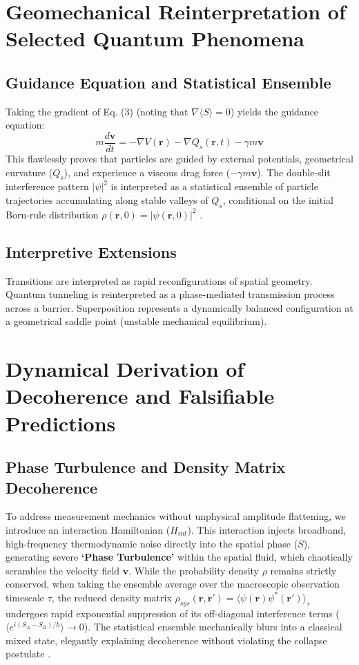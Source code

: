 \documentclass[reprint,amsmath,amssymb,aps,prd]{revtex4-2}
\begin{document}
\section{Geomechanical Reinterpretation of Selected Quantum Phenomena}

\subsection{Guidance Equation and Statistical Ensemble}
Taking the gradient of Eq. (3) (noting that $\nabla \langle S \rangle = 0$) yields the guidance equation:
\begin{equation}
m \frac{d\mathbf{v}}{dt} = -\nabla V(\mathbf{r}) - \nabla Q_s(\mathbf{r}, t) - \gamma m \mathbf{v}
\end{equation}
This flawlessly proves that particles are guided by external potentials, geometrical curvature ($Q_s$), and experience a viscous drag force ($-\gamma m \mathbf{v}$).
The double-slit interference pattern $|\psi|^2$ is interpreted as a statistical ensemble of particle trajectories accumulating along stable valleys of $Q_s$, conditional on the initial Born-rule distribution $\rho(\mathbf{r},0) = |\psi(\mathbf{r},0)|^2$ \cite{Couder2006}.
\subsection{Interpretive Extensions}
Transitions are interpreted as rapid reconfigurations of spatial geometry.
Quantum tunneling is reinterpreted as a phase-mediated transmission process across a barrier.
Superposition represents a dynamically balanced configuration at a geometrical saddle point (unstable mechanical equilibrium).
\section{Dynamical Derivation of Decoherence and Falsifiable Predictions}

\subsection{Phase Turbulence and Density Matrix Decoherence}
To address measurement mechanics without unphysical amplitude flattening, we introduce an interaction Hamiltonian ($H_{int}$).
This interaction injects broadband, high-frequency thermodynamic noise directly into the spatial phase ($S$), generating severe \textbf{`Phase Turbulence'} within the spatial fluid, which chaotically scrambles the velocity field $\mathbf{v}$.
While the probability density $\rho$ remains strictly conserved, when taking the ensemble average over the macroscopic observation timescale $\tau$, the reduced density matrix $\rho_{sys}(\mathbf{r}, \mathbf{r}') = \langle \psi(\mathbf{r})\psi^*(\mathbf{r}') \rangle_{\tau}$ undergoes rapid exponential suppression of its off-diagonal interference terms ($\langle e^{i(S_A - S_B)/\hbar} \rangle \to 0$).
The statistical ensemble mechanically blurs into a classical mixed state, elegantly explaining decoherence without violating the collapse postulate \cite{Zurek2003}.
\end{document}
